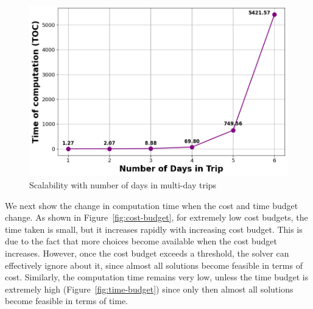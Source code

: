 \begin{figure}[th]
    \centering
\includegraphics[width=\columnwidth]{plots/multidayvstoc.png}
     \caption{Scalability with number of days in multi-day trips}
    \label{fig:number-of-days}
\end{figure}





We next show the change in computation time when the cost and time budget change.
As shown in Figure~\ref{fig:cost-budget}, for extremely low cost budgets, the time taken is small, but it increases rapidly with increasing cost budget. This is due to the fact that more choices become available when the cost budget increases. However, once the cost budget exceeds a threshold, the solver can effectively ignore about it, since almost all solutions become feasible in terms of cost.
Similarly, the computation time remains very low, unless the time budget is extremely high (Figure~\ref{fig:time-budget}) since only then almost all solutions become feasible in terms of time.

